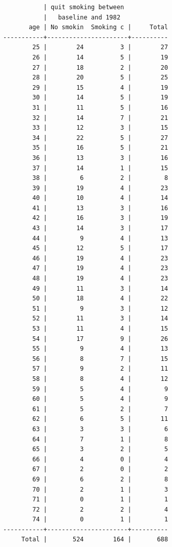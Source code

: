 \documentclass[
  10pt,
]{book}
\begin{document}
\begin{verbatim}
           | quit smoking between
           |   baseline and 1982
       age | No smokin  Smoking c |     Total
-----------+----------------------+----------
        25 |        24          3 |        27 
        26 |        14          5 |        19 
        27 |        18          2 |        20 
        28 |        20          5 |        25 
        29 |        15          4 |        19 
        30 |        14          5 |        19 
        31 |        11          5 |        16 
        32 |        14          7 |        21 
        33 |        12          3 |        15 
        34 |        22          5 |        27 
        35 |        16          5 |        21 
        36 |        13          3 |        16 
        37 |        14          1 |        15 
        38 |         6          2 |         8 
        39 |        19          4 |        23 
        40 |        10          4 |        14 
        41 |        13          3 |        16 
        42 |        16          3 |        19 
        43 |        14          3 |        17 
        44 |         9          4 |        13 
        45 |        12          5 |        17 
        46 |        19          4 |        23 
        47 |        19          4 |        23 
        48 |        19          4 |        23 
        49 |        11          3 |        14 
        50 |        18          4 |        22 
        51 |         9          3 |        12 
        52 |        11          3 |        14 
        53 |        11          4 |        15 
        54 |        17          9 |        26 
        55 |         9          4 |        13 
        56 |         8          7 |        15 
        57 |         9          2 |        11 
        58 |         8          4 |        12 
        59 |         5          4 |         9 
        60 |         5          4 |         9 
        61 |         5          2 |         7 
        62 |         6          5 |        11 
        63 |         3          3 |         6 
        64 |         7          1 |         8 
        65 |         3          2 |         5 
        66 |         4          0 |         4 
        67 |         2          0 |         2 
        69 |         6          2 |         8 
        70 |         2          1 |         3 
        71 |         0          1 |         1 
        72 |         2          2 |         4 
        74 |         0          1 |         1 
-----------+----------------------+----------
     Total |       524        164 |       688 


\end{verbatim}
\end{document}
